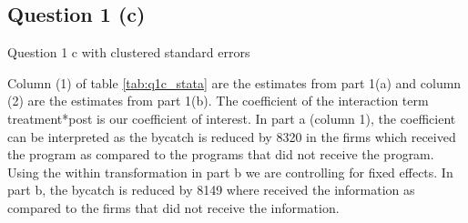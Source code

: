 \documentclass{article}
\begin{document}
\newpage

\subsection{Question 1 (c)}
\begin{table}[ht]
    \centering
    
    \caption{Question 1 c with clustered standard errors }
    \label{tab:q1c_stata}
\end{table}
Column (1) of table \ref{tab:q1c_stata} are the estimates from part 1(a) and column (2) are the estimates from part 1(b). The coefficient of the interaction term treatment*post is our coefficient of interest. In part a (column 1), the coefficient can be interpreted as the bycatch is reduced by 8320 in the firms which received the program as compared to the programs that did not receive the program. Using the within transformation in part b we are controlling for fixed effects. In part b, the bycatch is reduced by 8149 where received the information as compared to the firms that did not receive the information.
\end{document}
